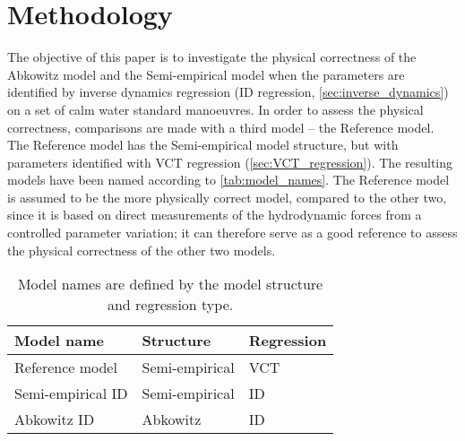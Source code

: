 \section{Methodology}
\label{sec:methodology}
The objective of this paper is to investigate the physical correctness of the Abkowitz model and the Semi-empirical model when the parameters are identified by inverse dynamics regression (ID regression, \autoref{sec:inverse_dynamics}) on a set of calm water standard manoeuvres. In order to assess the physical correctness, comparisons are made with a third model -- the Reference model. The Reference model has the Semi-empirical model structure, but with parameters identified with VCT regression (\autoref{sec:VCT_regression}). The resulting models have been named according to \autoref{tab:model_names}.
The Reference model is assumed to be the more physically correct model, compared to the other two, since it is based on direct measurements of the hydrodynamic forces from a controlled parameter variation; it can therefore serve as a good reference to assess the physical correctness of the other two models.
\begin{table}[h]
    \caption{Model names are defined by the model structure and regression type.}
    \label{tab:model_names}
    \centering
    \begin{tabular}{l l l}
        Model name & Structure & Regression \\
        \hline
        Reference model & Semi-empirical & VCT \\
        Semi-empirical ID & Semi-empirical & ID \\
        Abkowitz ID & Abkowitz & ID \\
    \end{tabular}
\end{table}

\FloatBarrier
